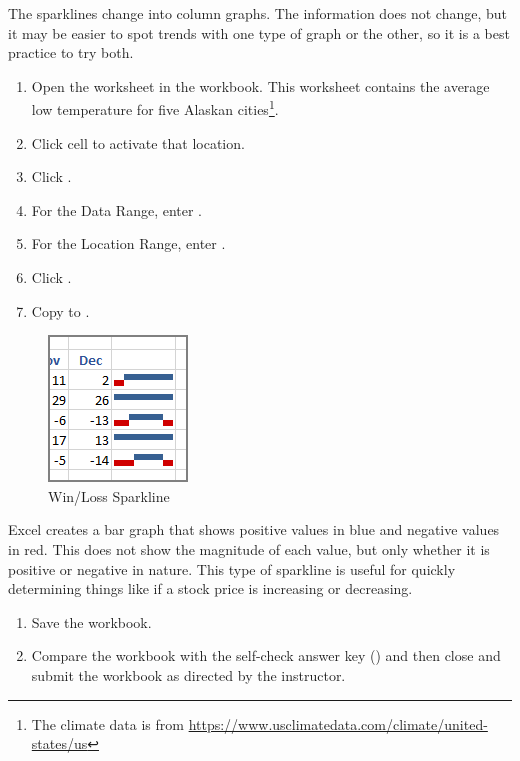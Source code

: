The sparklines change into column graphs. The information does not change, but it may be easier to spot trends with one type of graph or the other, so it is a best practice to try both.

\begin{enumerate}[resume]
	\item Open the  worksheet in the  workbook. This worksheet contains the average low temperature for five Alaskan cities\footnote{The climate data is from  \url{https://www.usclimatedata.com/climate/united-states/us}}.
	\item Click cell  to activate that location.
	\item Click .
	\item For the Data Range, enter .
	\item For the Location Range, enter .
	\item Click .
	\item Copy  to .
\end{enumerate}

\begin{figure}[H]
	\centering
	\includegraphics[width=\maxwidth{.50\linewidth}]{gfx/ch08_fig06}
	\caption{Win/Loss Sparkline}
	\label{08:fig06}
\end{figure}

Excel creates a bar graph that shows positive values in blue and negative values in red. This does not show the magnitude of each value, but only whether it is positive or negative in nature. This type of sparkline is useful for quickly determining things like if a stock price is increasing or decreasing.

\begin{enumerate}[resume]
	\item Save the  workbook.
	\item Compare the workbook with the self-check answer key () and then close and submit the  workbook as directed by the instructor.

\end{enumerate}

